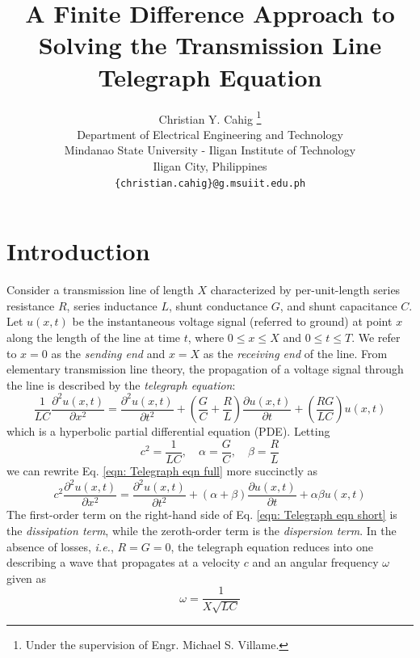 \documentclass{article}
\title{A Finite Difference Approach to Solving the Transmission Line Telegraph Equation}
\author{Christian Y. Cahig
	\thanks{Under the supervision of Engr. Michael S. Villame.} \\
	Department of Electrical Engineering and Technology\\
	Mindanao State University - Iligan Institute of Technology\\
	Iligan City, Philippines \\
	\texttt{\{christian.cahig\}@g.msuiit.edu.ph} \\
}
\begin{document}
\maketitle

\begin{abstract}
\lipsum[4]
\end{abstract}

\section{Introduction}
\label{sec: Introduction}

Consider a transmission line of length $X$ characterized by per-unit-length
series resistance $R$,
series inductance $L$,
shunt conductance $G$,
and
shunt capacitance $C$.
Let $u \left(x,t\right)$ be the instantaneous voltage signal (referred to ground)
at point $x$ along the length of the line at time $t$,
where $0 \leq x \leq X$ and $0 \leq t \leq T$.
We refer to $x = 0$ as the \textit{sending end} and $x=X$ as the \textit{receiving end} of the line.
From elementary transmission line theory,
the propagation of a voltage signal through the line is described by the \textit{telegraph equation}:
\begin{equation}
   \label{eqn: Telegraph eqn full}
   \frac{1}{LC} \frac{\partial^{2} u \left(x,t\right)}{\partial x^{2}}
   =
   \frac{\partial^{2} u \left(x,t\right)}{\partial t^{2}}
   +
   \left(\frac{G}{C} + \frac{R}{L}\right) \frac{\partial u \left(x,t\right)}{\partial t}
   +
   \left(\frac{RG}{LC}\right) u \left(x,t\right)
\end{equation}
which is a hyperbolic partial differential equation (PDE).
Letting
\begin{equation*}
   c^{2} = \frac{1}{LC}, \quad \alpha = \frac{G}{C}, \quad \beta = \frac{R}{L}
\end{equation*}
we can rewrite Eq. \ref{eqn: Telegraph eqn full} more succinctly as
\begin{equation}
   \label{eqn: Telegraph eqn short}
   c^{2} \frac{\partial^{2} u \left(x,t\right)}{\partial x^{2}}
   =
   \frac{\partial^{2} u \left(x,t\right)}{\partial t^{2}}
   +
   \left(\alpha + \beta\right) \frac{\partial u \left(x,t\right)}{\partial t}
   +
   \alpha \beta u \left(x,t\right)
\end{equation}
The first-order term on the right-hand side of Eq. \ref{eqn: Telegraph eqn short} is the \textit{dissipation term},
while the zeroth-order term is the \textit{dispersion term}.
In the absence of losses, \textit{i.e.}, $R=G=0$, the telegraph equation reduces into one describing a wave
that propagates at a velocity $c$ and an angular frequency $\omega$ given as
\begin{equation}
   \label{eqn: Omega}
   \omega = \frac{1}{X \sqrt{LC}}
\end{equation}
\end{document}

